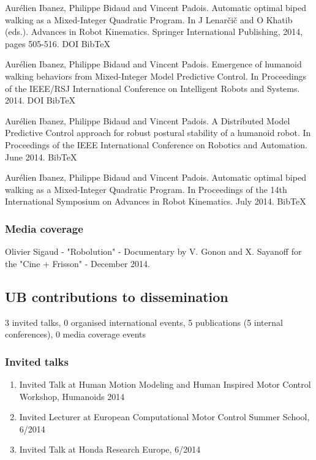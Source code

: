 Aurélien Ibanez, Philippe Bidaud and Vincent Padois. Automatic optimal biped walking as a Mixed-Integer Quadratic Program. In J Lenar\v ci\v c and O Khatib (eds.). Advances in Robot Kinematics. Springer International Publishing, 2014, pages 505-516. DOI BibTeX

Aurélien Ibanez, Philippe Bidaud and Vincent Padois. Emergence of humanoid walking behaviors from Mixed-Integer Model Predictive Control. In Proceedings of the IEEE/RSJ International Conference on Intelligent Robots and Systems. 2014. DOI BibTeX

Aurélien Ibanez, Philippe Bidaud and Vincent Padois. A Distributed Model Predictive Control approach for robust postural stability of a humanoid robot. In Proceedings of the IEEE International Conference on Robotics and Automation. June 2014. BibTeX

Aurélien Ibanez, Philippe Bidaud and Vincent Padois. Automatic optimal biped walking as a Mixed-Integer Quadratic Program. In Proceedings of the 14th International Symposium on Advances in Robot Kinematics. July 2014. BibTeX

\subsubsection{Media coverage}

Olivier Sigaud - "Robolution" - Documentary by  V. Gonon and X. Sayanoff for the "Cine + Frisson" - December 2014.

\subsection{UB contributions to dissemination}

3 invited talks, 0 organised international events, 5 publications (5 internal conferences), 0 media coverage events

\subsubsection{Invited talks}

\begin{enumerate}
\item Invited Talk at Human Motion Modeling and Human Inspired Motor Control Workshop, Humanoids 2014
\item Invited Lecturer at European Computational Motor Control Summer School, 6/2014
\item Invited Talk at Honda Research Europe, 6/2014
\end{enumerate}

